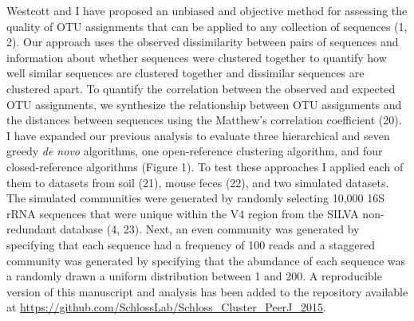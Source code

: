 \documentclass[11pt,]{article}
\begin{document}
Westcott and I have proposed an unbiased and objective method for
assessing the quality of OTU assignments that can be applied to any
collection of sequences (1, 2). Our approach uses the observed
dissimilarity between pairs of sequences and information about whether
sequences were clustered together to quantify how well similar sequences
are clustered together and dissimilar sequences are clustered apart. To
quantify the correlation between the observed and expected OTU
assignments, we synthesize the relationship between OTU assignments and
the distances between sequences using the Matthew's correlation
coefficient (20). I have expanded our previous analysis to evaluate
three hierarchical and seven greedy \emph{de novo} algorithms, one
open-reference clustering algorithm, and four closed-reference
algorithms (Figure 1). To test these approaches I applied each of them
to datasets from soil (21), mouse feces (22), and two simulated
datasets. The simulated communities were generated by randomly selecting
10,000 16S rRNA sequences that were unique within the V4 region from the
SILVA non-redundant database (4, 23). Next, an even community was
generated by specifying that each sequence had a frequency of 100 reads
and a staggered community was generated by specifying that the abundance
of each sequence was a randomly drawn a uniform distribution between 1
and 200. A reproducible version of this manuscript and analysis has been
added to the repository available at
\url{https://github.com/SchlossLab/Schloss_Cluster_PeerJ_2015}.
\end{document}
